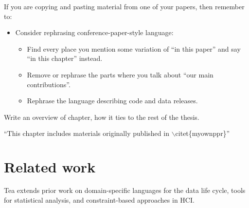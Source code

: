 If you are copying and pasting material from one of your papers, then remember to:
\begin{itemize}
    \item Consider rephrasing conference-paper-style language:
    \begin{itemize}
        \item Find every place you mention some variation of ``in this paper'' and say ``in this chapter'' instead.
        \item Remove or rephrase the parts where you talk about ``our main contributions''.
        \item Rephrase the language describing code and data releases.
    \end{itemize}
\end{itemize}

{\color{orange} Write an overview of chapter, how it ties to the rest of the thesis.}

{\color{orange} ``This chapter includes materials originally published in $\backslash$citet\{myownppr\}''}

\section{Related work}
Tea extends prior work on domain-specific languages for the data life cycle, 
tools for statistical analysis, and constraint-based approaches in HCI. 

\vspace{-6pt}
